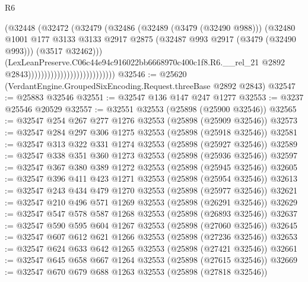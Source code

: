 \begin{lexlean}{R6}
\begin{coremodule}
                                                  (@32448
                                                    (@32472
                                                      (@32479
                                                        (@32486
                                                          (@32489 (@3479 (@32490 @988)))
                                                          (@32480
                                                            @1001
                                                            @177
                                                            @3133
                                                            @3133
                                                            @2917
                                                            @2875
                                                            (@32487
                                                              @993
                                                              @2917
                                                              (@3479 (@32490 @993)))
                                                            (@3517 @32462)))
                                                        (LexLeanPreserve.C06c44e94c916022bb6668970c400c1f8.R6.__rel_21
                                                          @2892
                                                          @2843)))))))))))))))))))))))))))
@32546 := @25620 (VerdantEngine.GroupedSixEncoding.Request.threeBase @2892 @2843)
@32547 := @25883 @32546
@32551 := @32547 @136 @147 @247 @1277
@32553 := @3237 @25546 @20529
@32557 := @32551 @32553 (@25898 (@25900 @32546))
@32565 := @32547 @254 @267 @277 @1276 @32553 (@25898 (@25909 @32546))
@32573 := @32547 @284 @297 @306 @1275 @32553 (@25898 (@25918 @32546))
@32581 := @32547 @313 @322 @331 @1274 @32553 (@25898 (@25927 @32546))
@32589 := @32547 @338 @351 @360 @1273 @32553 (@25898 (@25936 @32546))
@32597 := @32547 @367 @380 @389 @1272 @32553 (@25898 (@25945 @32546))
@32605 := @32547 @396 @411 @423 @1271 @32553 (@25898 (@25954 @32546))
@32613 := @32547 @243 @434 @479 @1270 @32553 (@25898 (@25977 @32546))
@32621 := @32547 @210 @496 @571 @1269 @32553 (@25898 (@26291 @32546))
@32629 := @32547 @547 @578 @587 @1268 @32553 (@25898 (@26893 @32546))
@32637 := @32547 @590 @595 @604 @1267 @32553 (@25898 (@27060 @32546))
@32645 := @32547 @607 @612 @621 @1266 @32553 (@25898 (@27236 @32546))
@32653 := @32547 @624 @633 @642 @1265 @32553 (@25898 (@27421 @32546))
@32661 := @32547 @645 @658 @667 @1264 @32553 (@25898 (@27615 @32546))
@32669 := @32547 @670 @679 @688 @1263 @32553 (@25898 (@27818 @32546))

\end{coremodule}
\end{lexlean}
